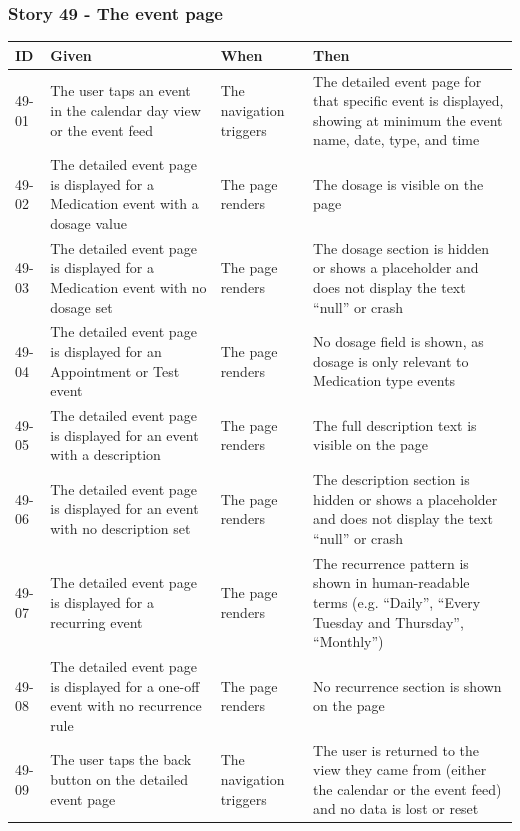 \documentclass[a4paper,12pt]{article}
\begin{document}
\subsubsection{Story 49 - The event page}

\begin{longtable}{|p{}|p{}|p{}|p{}|}
    \hline
    \textbf{ID} & \textbf{Given} & \textbf{When} & \textbf{Then} \\
    \hline
    \endhead
    49-01 & The user taps an event in the calendar day view or the event feed & The navigation triggers & The detailed event page for that specific event is displayed, showing at minimum the event name, date, type, and time \\
    \hline
    49-02 & The detailed event page is displayed for a Medication event with a dosage value & The page renders & The dosage is visible on the page \\
    \hline
    49-03 & The detailed event page is displayed for a Medication event with no dosage set & The page renders & The dosage section is hidden or shows a placeholder and does not display the text ``null'' or crash \\
    \hline
    49-04 & The detailed event page is displayed for an Appointment or Test event & The page renders & No dosage field is shown, as dosage is only relevant to Medication type events \\
    \hline
    49-05 & The detailed event page is displayed for an event with a description & The page renders & The full description text is visible on the page \\
    \hline
    49-06 & The detailed event page is displayed for an event with no description set & The page renders & The description section is hidden or shows a placeholder and does not display the text ``null'' or crash \\
    \hline
    49-07 & The detailed event page is displayed for a recurring event & The page renders & The recurrence pattern is shown in human-readable terms (e.g. ``Daily'', ``Every Tuesday and Thursday'', ``Monthly'') \\
    \hline
    49-08 & The detailed event page is displayed for a one-off event with no recurrence rule & The page renders & No recurrence section is shown on the page \\
    \hline
    49-09 & The user taps the back button on the detailed event page & The navigation triggers & The user is returned to the view they came from (either the calendar or the event feed) and no data is lost or reset \\
    \hline
\end{longtable}
\end{document}
